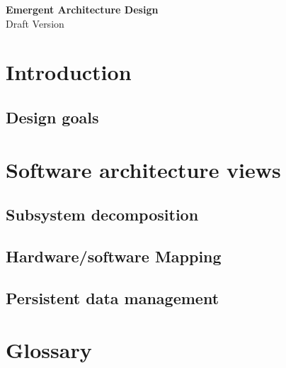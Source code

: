 \documentclass{article}
\begin{document}
\begin{minipage}[H]{\textwidth}
\vspace{0.3cm}
		\begin{center}
		  \vspace{0.3cm}
		  \Huge{\textbf{Emergent Architecture Design}}\\
		  \huge{Draft Version}
	      \vspace{0.3cm}	
   		  \vspace{0.7cm}	
		\end{center}
	\end{minipage}
\tableofcontents
\newpage
	\section{Introduction}
	
	 \subsection{Design goals}
	 
	 \section{Software architecture views}
	 \subsection{Subsystem decomposition} 
	 
	 \subsection{Hardware/software Mapping} 
	 
	 \subsection{Persistent data management} 
	 
\newpage
	\section{Glossary}
\end{document}
